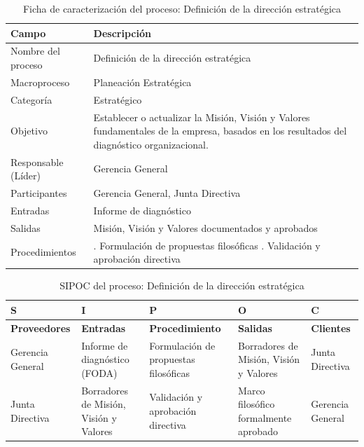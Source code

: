 \documentclass[11pt, a4paper, oneside]{report}
\begin{document}
\begin{table}[H]
\centering\small
\renewcommand{\arraystretch}{1.35}
\setlength{\tabcolsep}{6pt}
\begin{tabularx}{\textwidth}{|>{\raggedright\arraybackslash}p{}|>{\raggedright\arraybackslash}X|}
\hline
\rowcolor{upeu_dark}
\color{white}\bfseries Campo & \color{white}\bfseries Descripción \\ \hline
\rowcolor{gray!10}
Nombre del proceso & Definición de la dirección estratégica \\ \hline
Macroproceso & Planeación Estratégica \\ \hline
\rowcolor{gray!10}
Categoría & Estratégico \\ \hline
Objetivo & Establecer o actualizar la Misión, Visión y Valores fundamentales de la empresa, basados en los resultados del diagnóstico organizacional. \\ \hline
\rowcolor{gray!10}
Responsable (Líder) & Gerencia General \\ \hline
Participantes & Gerencia General, Junta Directiva \\ \hline
\rowcolor{gray!10}
Entradas & Informe de diagnóstico \\ \hline
Salidas & Misión, Visión y Valores documentados y aprobados \\ \hline
\rowcolor{gray!10}
Procedimientos & 1. Formulación de propuestas filosóficas \newline 2. Validación y aprobación directiva \\ \hline
\end{tabularx}
\caption{Ficha de caracterización del proceso: Definición de la dirección estratégica}
\end{table}

\begin{table}[H]
\centering\small
\renewcommand{\arraystretch}{1.3}
\setlength{\tabcolsep}{4pt}
\begin{tabularx}{\textwidth}{|>{\raggedright\arraybackslash}p{}|>{\raggedright\arraybackslash}p{}|>{\raggedright\arraybackslash}p{}|>{\raggedright\arraybackslash}p{}|>{\raggedright\arraybackslash}X|}
\hline
\rowcolor{upeu_dark}
\color{white}\bfseries S & \color{white}\bfseries I & \color{white}\bfseries P & \color{white}\bfseries O & \color{white}\bfseries C \\ \hline
\rowcolor{upeu_light}
\bfseries Proveedores & \bfseries Entradas & \bfseries Procedimiento & \bfseries Salidas & \bfseries Clientes \\ \hline
Gerencia General &
Informe de diagnóstico (FODA) &
Formulación de propuestas filosóficas &
Borradores de Misión, Visión y Valores &
Junta Directiva \\ \hline
\rowcolor{gray!10}
Junta Directiva &
Borradores de Misión, Visión y Valores &
Validación y aprobación directiva &
Marco filosófico formalmente aprobado &
Gerencia General \\ \hline
\end{tabularx}
\caption{SIPOC del proceso: Definición de la dirección estratégica}
\end{table}
\end{document}
